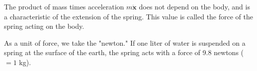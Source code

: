 The product of mass times acceleration $m\ddot{\mathbf{x}}$ does not depend on the body, and is a characteristic of the extension of the spring. This value is called the force of the spring acting on the body.

As a unit of force, we take the "newton." If one liter of water is suspended on a spring at the surface of the earth, the spring acts with a force of 9.8 newtons ($= 1$ kg).
